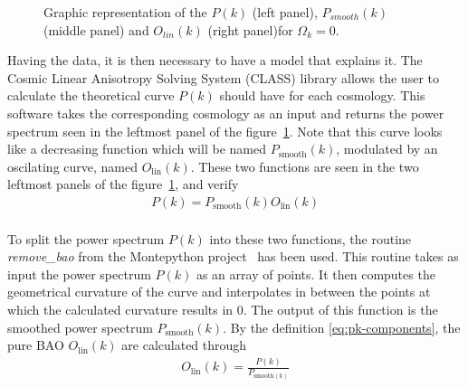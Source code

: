 \begin{figure}[t]
	\centering
	\caption{Graphic representation of the $P(k)$ (left panel), $P_{smooth}(k)$ (middle panel) and $O_{lin}(k)$ (right panel)for $\Omega_k = 0$.}
	\label{fig:PkOlPsm}
\end{figure}

Having the data, it is then necessary to have a model that explains it. The Cosmic Linear Anisotropy Solving System (CLASS) \cite{class} library allows the user to calculate the theoretical curve $P(k)$ should have for each cosmology. This software takes the corresponding cosmology as an input and returns the power spectrum seen in the leftmost panel of the figure~\ref{fig:PkOlPsm}. Note that this curve looks like a decreasing function which will be named $P_{\text{smooth}}(k)$, modulated by an oscilating curve, named $O_{\text{lin}}(k)$. These two functions are seen in the two leftmost panels of the figure~\ref{fig:PkOlPsm}, and verify 
\begin{align}
	P(k) = P_{\text{smooth}}(k) O_{\text{lin}}(k)
	\label{eq:pk-components}
\end{align}\\

To split the power spectrum $P(k)$ into these two functions, the routine \textit{remove\_bao} from the Montepython project~\cite{montepython} has been used. This routine takes as input the power spectrum $P(k)$ as an array of points. It then computes the geometrical curvature of the curve and interpolates in between the points at which the calculated curvature results in 0. The output of this function is the smoothed power spectrum $P_{\text{smooth}}(k)$. By the definition \eqref{eq:pk-components}, the pure BAO  $O_{\text{lin}}(k)$ are calculated through 
\begin{align}
	O_{\text{lin}}(k) = \frac{P(k)}{P_{\text{smooth}(k)}}
\end{align}

